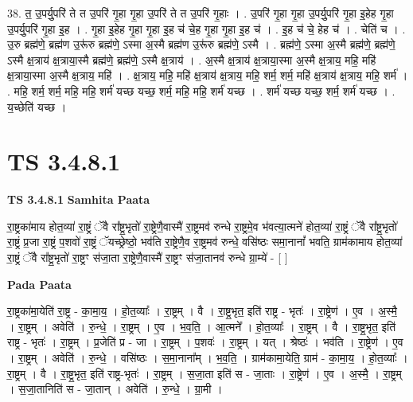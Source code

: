 \documentclass[17pt]{extarticle}
\begin{document}
38. त॒ उ॒पर्यु॒परि॑ ते त उ॒परि॑ गृ॒हा गृ॒हा उ॒परि॑ ते त उ॒परि॑ गृ॒हाः । . उ॒परि॑ गृ॒हा गृ॒हा उ॒पर्यु॒परि॑ गृ॒हा इ॒हेह गृ॒हा उ॒पर्यु॒परि॑ गृ॒हा इ॒ह । . गृ॒हा इ॒हेह गृ॒हा गृ॒हा इ॒ह च॑ चे॒ह गृ॒हा गृ॒हा इ॒ह च॑ । . इ॒ह च॑ चे॒ हेह च॑ । . चेति॑ च । . उ॒रु ब्रह्म॑णे॒ ब्रह्म॑ण उ॒रू॑रु ब्रह्म॑णे॒ ऽस्मा अ॒स्मै ब्रह्म॑ण उ॒रू॑रु ब्रह्म॑णे॒ ऽस्मै । . ब्रह्म॑णे॒ ऽस्मा अ॒स्मै ब्रह्म॑णे॒ ब्रह्म॑णे॒ ऽस्मै क्ष॒त्राय॑ क्ष॒त्राया॒स्मै ब्रह्म॑णे॒ ब्रह्म॑णे॒ ऽस्मै क्ष॒त्राय॑ । . अ॒स्मै क्ष॒त्राय॑ क्ष॒त्राया॒स्मा अ॒स्मै क्ष॒त्राय॒ महि॒ महि॑ क्ष॒त्राया॒स्मा अ॒स्मै क्ष॒त्राय॒ महि॑ । . क्ष॒त्राय॒ महि॒ महि॑ क्ष॒त्राय॑ क्ष॒त्राय॒ महि॒ शर्म॒ शर्म॒ महि॑ क्ष॒त्राय॑ क्ष॒त्राय॒ महि॒ शर्म॑ । . महि॒ शर्म॒ शर्म॒ महि॒ महि॒ शर्म॑ यच्छ यच्छ॒ शर्म॒ महि॒ महि॒ शर्म॑ यच्छ । . शर्म॑ यच्छ यच्छ॒ शर्म॒ शर्म॑ यच्छ । . य॒च्छेति॑ यच्छ । \newline
\pagebreak
{}

\section{ TS 3.4.8.1 }

\textbf{TS 3.4.8.1 } \newline
\textbf{Samhita Paata} \newline

रा॒ष्ट्रका॑माय होत॒व्या॑ रा॒ष्ट्रं ॅवै रा᳚ष्ट्र॒भृतो॑ रा॒ष्ट्रेणै॒वास्मै॑ रा॒ष्ट्रमव॑ रुन्धे रा॒ष्ट्रमे॒व भ॑वत्या॒त्मने॑ होत॒व्या॑ रा॒ष्ट्रं ॅवै रा᳚ष्ट्र॒भृतो॑ रा॒ष्ट्रं प्र॒जा रा॒ष्ट्रं प॒शवो॑ रा॒ष्ट्रं ॅयच्छ्रेष्ठो॒ भव॑ति रा॒ष्ट्रेणै॒व रा॒ष्ट्रमव॑ रुन्धे॒ वसि॑ष्ठः समा॒नानां᳚ भवति॒ ग्राम॑कामाय होत॒व्या॑ रा॒ष्ट्रं ॅवै रा᳚ष्ट्र॒भृतो॑ रा॒ष्ट्रꣳ स॑जा॒ता रा॒ष्ट्रेणै॒वास्मै॑ रा॒ष्ट्रꣳ स॑जा॒तानव॑ रुन्धे ग्रा॒म्ये॑ - [  ] \newline

\textbf{Pada Paata} \newline

रा॒ष्ट्रका॑मा॒येति॑ रा॒ष्ट्र - का॒मा॒य॒ । हो॒त॒व्याः᳚ । रा॒ष्ट्रम् । वै । रा॒ष्ट्र॒भृत॒ इति॑ राष्ट्र - भृतः॑ । रा॒ष्ट्रेण॑ । ए॒व । अ॒स्मै॒ । रा॒ष्ट्रम् । अवेति॑ । रु॒न्धे॒ । रा॒ष्ट्रम् । ए॒व । भ॒व॒ति॒ । आ॒त्मने᳚ । हो॒त॒व्याः᳚ । रा॒ष्ट्रम् । वै । रा॒ष्ट्र॒भृत॒ इति॑ राष्ट्र - भृतः॑ । रा॒ष्ट्रम् । प्र॒जेति॑ प्र - जा । रा॒ष्ट्रम् । प॒शवः॑ । रा॒ष्ट्रम् । यत् । श्रेष्ठः॑ । भव॑ति । रा॒ष्ट्रेण॑ । ए॒व । रा॒ष्ट्रम् । अवेति॑ । रु॒न्धे॒ । वसि॑ष्ठः । स॒मा॒नाना᳚म् । भ॒व॒ति॒ । ग्राम॑कामा॒येति॒ ग्राम॑ - का॒मा॒य॒ । हो॒त॒व्याः᳚ । रा॒ष्ट्रम् । वै । रा॒ष्ट्र॒भृत॒ इति॑ राष्ट्र-भृतः॑ । रा॒ष्ट्रम् । स॒जा॒ता इति॑ स - जा॒ताः । रा॒ष्ट्रेण॑ । ए॒व । अ॒स्मै॒ । रा॒ष्ट्रम् । स॒जा॒तानिति॑ स - जा॒तान् । अवेति॑ । रु॒न्धे॒ । ग्रा॒मी ।  \newline
\end{document}
